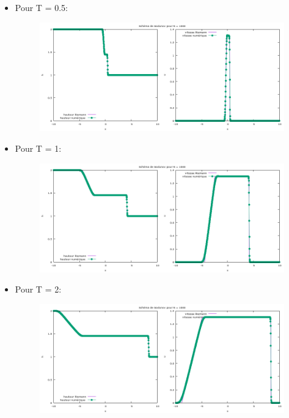 \begin{itemize}
\begin{itemize}
\newpage
\item Pour T = 0.5:

\begin{figure}[h!]
	\centering \includegraphics[scale=0.5]{Images_Fichiers/tp2godu1000_05.png}
\end{figure}

\item Pour T = 1:

\begin{figure}[h!]
	\centering \includegraphics[scale=0.5]{Images_Fichiers/tp2godu1000_1.png}
\end{figure}

\newpage
\item Pour T = 2:

\begin{figure}[h!]
	\centering \includegraphics[scale=0.5]{Images_Fichiers/tp2godu1000_2.png}
\end{figure}


\end{itemize}
\end{itemize}
